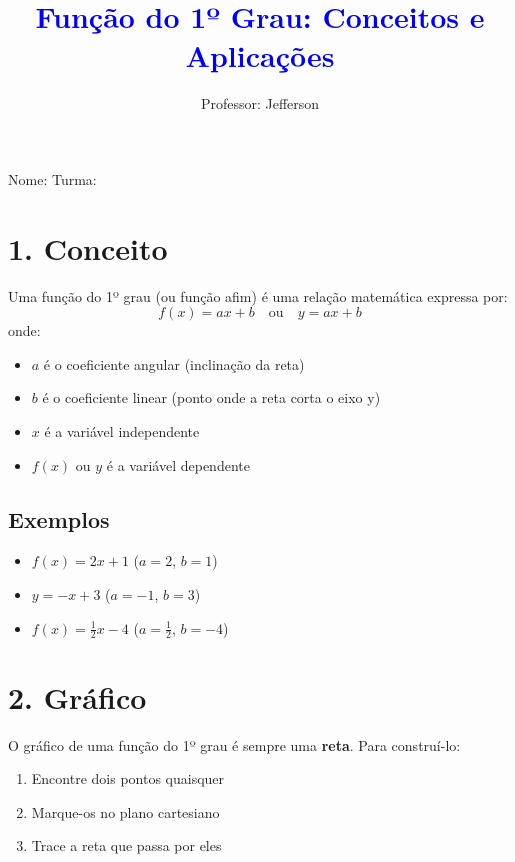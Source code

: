 \documentclass[11pt]{article}
\title{\textcolor{blue}{Função do 1º Grau: Conceitos e Aplicações}}
\author{Professor: Jefferson}
\date{}
\begin{document}
\maketitle
\vspace{-1cm}

\begin{center}
\large{Nome: \underline{\hspace{8cm}} \quad Turma: \underline{\hspace{3cm}}}
\end{center}

\begin{multicols}{2}

\section*{1. Conceito}
Uma função do 1º grau (ou função afim) é uma relação matemática expressa por:
\[
f(x) = ax + b \quad \text{ou} \quad y = ax + b
\]
onde:
\begin{itemize}
    \item $a$ é o coeficiente angular (inclinação da reta)
    \item $b$ é o coeficiente linear (ponto onde a reta corta o eixo y)
    \item $x$ é a variável independente
    \item $f(x)$ ou $y$ é a variável dependente
\end{itemize}

\subsection*{Exemplos}
\begin{itemize}
    \item $f(x) = 2x + 1$ \quad ($a=2$, $b=1$)
    \item $y = -x + 3$ \quad ($a=-1$, $b=3$)
    \item $f(x) = \frac{1}{2}x - 4$ \quad ($a=\frac{1}{2}$, $b=-4$)
\end{itemize}

\section*{2. Gráfico}
O gráfico de uma função do 1º grau é sempre uma \textbf{reta}. Para construí-lo:

\begin{enumerate}
    \item Encontre dois pontos quaisquer
    \item Marque-os no plano cartesiano
    \item Trace a reta que passa por eles
\end{enumerate}


\end{multicols}
\end{document}
